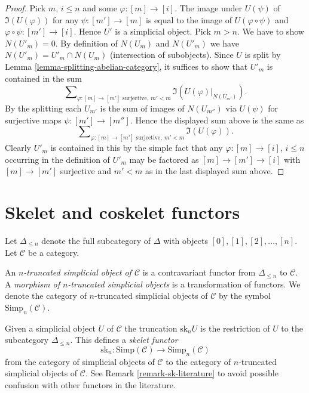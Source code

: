 \begin{proof}
Pick $m$, $i \leq n$ and some $\varphi : [m] \to [i]$.
The image under $U(\psi)$ of $\Im(U(\varphi))$
for any $\psi : [m'] \to [m]$ is
equal to the image of $U(\varphi \circ \psi)$ and
$\varphi \circ \psi : [m'] \to [i]$.
Hence $U'$ is a simplicial object.
Pick $m > n$. We have to show $N(U'_m) = 0$.
By definition of $N(U_m)$ and $N(U'_m)$ we have
$N(U'_m) = U'_m \cap N(U_m)$ (intersection of subobjects).
Since $U$ is split by Lemma \ref{lemma-splitting-abelian-category},
it suffices to show that $U'_m$ is contained in the sum
$$
\sum\nolimits_{\varphi : [m] \to [m']\text{ surjective}, \ m' < m}
\Im(U(\varphi)|_{N(U_{m'})}).
$$
By the splitting each $U_{m'}$ is the sum of images of
$N(U_{m''})$ via $U(\psi)$ for surjective maps
$\psi : [m'] \to [m'']$. Hence the displayed sum above
is the same as
$$
\sum\nolimits_{\varphi : [m] \to [m']\text{ surjective}, \ m' < m}
\Im(U(\varphi)).
$$
Clearly $U'_m$ is contained in this by the simple fact that
any $\varphi : [m] \to [i]$, $i \leq n$ occurring in the definition
of $U'_m$ may be factored as
$[m] \to [m'] \to [i]$ with $[m] \to [m']$ surjective
and $m' < m$ as in the last displayed sum above.
\end{proof}


\section{Skelet and coskelet functors}
\label{section-skelet}

\noindent
Let $\Delta_{\leq n}$ denote the full subcategory of
$\Delta$ with objects $[0], [1], [2], \ldots, [n]$.
Let $\mathcal{C}$ be a category.

\begin{definition}
\label{definition-truncated-simplicial-object}
An {\it $n$-truncated simplicial object of $\mathcal{C}$}
is a contravariant functor from $\Delta_{\leq n}$ to
$\mathcal{C}$. A {\it morphism of $n$-truncated
simplicial objects} is a transformation of functors.
We denote the category of $n$-truncated
simplicial objects of $\mathcal{C}$ by
the symbol $\text{Simp}_n(\mathcal{C})$.
\end{definition}

\noindent
Given a simplicial object $U$ of $\mathcal{C}$
the truncation $\text{sk}_n U$ is the restriction
of $U$ to the subcategory $\Delta_{\leq n}$.
This defines a {\it skelet functor}
$$
\text{sk}_n :
\text{Simp}(\mathcal{C}) \longrightarrow \text{Simp}_n(\mathcal{C})
$$
from the category of simplicial objects of $\mathcal{C}$
to the category of $n$-truncated simplicial objects of $\mathcal{C}$.
See Remark \ref{remark-sk-literature} to avoid possible confusion
with other functors in the literature.

